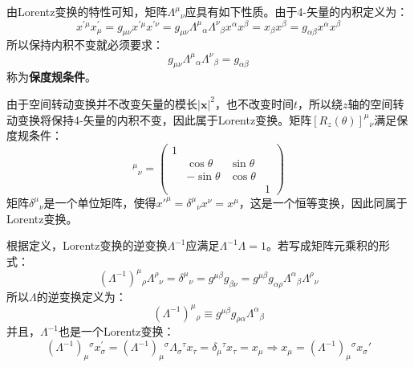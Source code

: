 \documentclass{book}
\begin{document}
由Lorentz变换的特性可知，矩阵$\Lambda^{\mu}{}_{\nu}$应具有如下性质。由于4-矢量的内积定义为：
\begin{equation}
	x^{\prime\mu}x_\mu^\prime =g_{\mu\nu}x^{\prime\mu}x^{\prime\nu}=g_{\mu\nu}\Lambda^\mu{}_\alpha\Lambda^\nu {}_\beta x^\alpha x^\beta=x_\beta x^\beta=g_{\alpha\beta} x^\alpha x^\beta
\end{equation}
所以保持内积不变就必须要求：
\begin{equation}
	g_{\mu\nu}\Lambda^\mu{}_\alpha\Lambda^\nu {}_\beta=g_{\alpha\beta}
	\label{1.10}
\end{equation}
称为\textbf{保度规条件}。

\begin{mdframed}[frametitle={Example}]

由于空间转动变换并不改变矢量的模长$|\mathbf{x}|^2$，也不改变时间$t$，所以绕$z$轴的空间转动变换将保持4-矢量的内积不变，因此属于Lorentz变换。矩阵$[R_z(\theta)]^{\mu}{}_\nu $满足保度规条件：
\begin{equation}
	[R_z(\theta)]^{\mu}{}_\nu=\begin{pmatrix}1\\&\cos\theta&\sin\theta\\&-\sin\theta&\cos\theta\\&&&1\end{pmatrix}
\end{equation}
矩阵$\delta^\mu{}_\nu$是一个单位矩阵，使得$x'^\mu=\delta^\mu{}_\nu x^\nu=x^\mu $，这是一个恒等变换，因此同属于Lorentz变换。
\end{mdframed}

根据定义，Lorentz变换的逆变换$\Lambda^{-1}$应满足$\Lambda^{-1}\Lambda=1$。若写成矩阵元乘积的形式：
\begin{equation}
(\Lambda^{-1})^\mu{}_\rho\Lambda^\rho{}_\nu=\delta^\mu{}_\nu=g^{\mu\beta}g_{\beta\nu}=g^{\mu\beta}g_{\alpha\rho}\Lambda^\alpha{}_\beta\Lambda^\rho{}_\nu	
\end{equation}
所以$\Lambda$的逆变换定义为：
\begin{equation}
	(\Lambda^{-1})^{\mu}{}_{\rho}\equiv g^{\mu\beta}g_{\rho\alpha}\Lambda^{\alpha}{}_{\beta}
\end{equation}
并且，$\Lambda^{-1}$也是一个Lorentz变换：
\begin{equation}
(\Lambda^{-1})_\mu{}^\sigma x_{\sigma}^{\prime}=(\Lambda^{-1})_\mu{}^\sigma\Lambda_\sigma{}^\tau x_\tau=\delta_\mu{}^\tau x_\tau=x_\mu\Rightarrow x_\mu=(\Lambda^{-1})_\mu{}^\sigma x_\sigma'
\end{equation}
\end{document}
